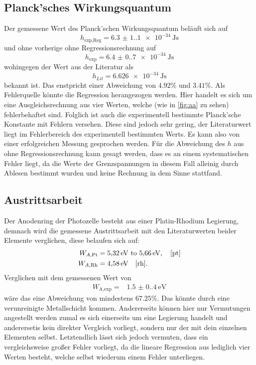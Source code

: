 \subsection{Planck'sches Wirkungsquantum}
Der gemessene Wert des Planck'schen Wirkungsquantum beläuft sich auf
\begin{equation*}
    h_\text{exp,Reg} = \qty{6.3(1.1)e-34}{\joule\second}
\end{equation*}
\noindent und ohne vorherige ohne Regressionsrechnung auf 
\begin{equation*}
    h_\text{exp} = \qty{6.4(0.7)e-34}{\joule\second}
\end{equation*}
\noindent wohingegen der Wert aus der Literatur als 
\begin{equation*}
    h_{Lit} = \SI{6.626e-34}{\joule\second}
\end{equation*}
bekannt ist. Das enstpricht einer Abweichung von $4.92 \%$ und $3.41 \%$. Als
Fehlerquelle könnte die Regression herangezogen werden. Hier handelt es sich um eine
Ausgleichsrechnung aus vier Werten, welche (wie in \autoref{fig:aa} zu sehen)
fehlerbehaftet sind. Folglich ist auch die experimentell bestimmte Planck'sche 
Konstante mit Fehlern versehen. Diese sind jedoch sehr gering, der Literaturwert
liegt im Fehlerbereich des experimentell bestimmten Werts. Es kann also von
einer erfolgreichen Messung gesprochen werden. Für die Abweichung des $h$ aus 
ohne Regressionsrechnung kann gesagt werden, dass es an einem systematischen 
Fehler liegt, da die Werte der Grenzspannungen in diesem Fall alleinig durch
Ablesen bestimmt wurden und keine Rechnung in dem Sinne stattfand.

\subsection{Austrittsarbeit}
Der Anodenring der Photozelle besteht aus einer Platin-Rhodium Legierung, 
demnach wird die gemessene Austrittsarbeit mit den Literaturwerten beider 
Elemente verglichen, diese belaufen sich auf:
\begin{align*}
    W_{A,\text{Pt}} &= \SIrange{5.32}{5.66}{\eV}, \quad \text{\cite{pt}} \\
    W_{A,\text{Rh}} &= \SI{4.58}{\eV} \quad \text{\cite{rh}}.
\end{align*}
Verglichen mit dem gemessenen Wert von 
\begin{align*}
    W_\text{A,exp} =& \qty{1.5(0.4)}{\eV}
\end{align*}
wäre das eine Abweichung von mindestens $67.25 \%$. Das könnte durch eine 
verunreinigte Metallschicht kommen. Andererseits können hier nur Vermutungen 
angestellt werden zumal es sich einerseits um eine Legierung handelt und 
anderersetis kein direkter Vergleich vorliegt, sondern nur der mit dein einzelnen 
Elementen selbst. Letztendlich lässt sich jedoch vermuten, dass ein vergleichsweise 
großer Fehler vorliegt, da die lineare Regression aus lediglich vier Werten 
besteht, welche selbst wiederum einem Fehler unterliegen.